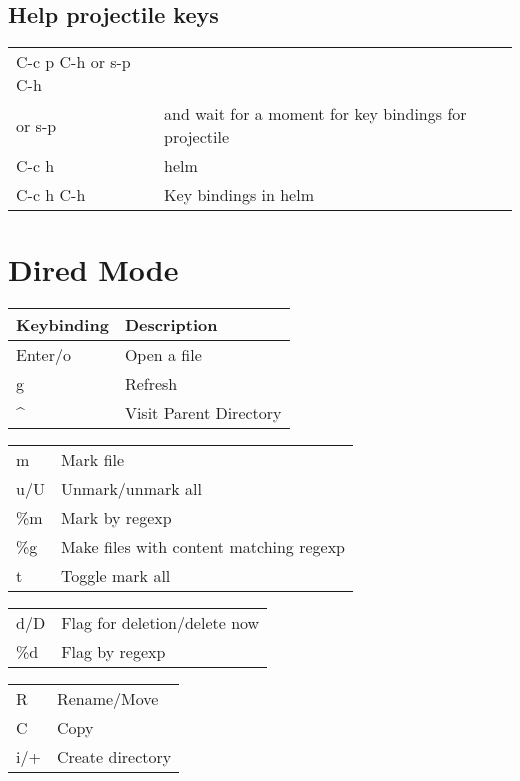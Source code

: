 \documentclass[11pt]{article}
\begin{document}
\subsection{Help projectile keys}
\label{sec:org0626144}
\begin{center}
\begin{tabular}{ll}
\hline
C-c p C-h or s-p C-h & \\
or s-p & and wait for a moment for key bindings for projectile\\
C-c h & helm\\
C-c h C-h & Key bindings in helm\\
\end{tabular}
\end{center}


\section{Dired Mode}
\label{sec:org5251596}
\begin{center}
\begin{tabular}{ll}
Keybinding & Description\\
\hline
Enter/o & Open a file\\
g & Refresh\\
\^{} & Visit Parent Directory\\
\end{tabular}
\end{center}

\begin{center}
\begin{tabular}{ll}
m & Mark file\\
u/U & Unmark/unmark all\\
\%m & Mark by regexp\\
\%g & Make files with content matching regexp\\
t & Toggle mark all\\
\end{tabular}
\end{center}

\begin{center}
\begin{tabular}{ll}
d/D & Flag for deletion/delete now\\
\%d & Flag by regexp\\
\end{tabular}
\end{center}

\begin{center}
\begin{tabular}{ll}
R & Rename/Move\\
C & Copy\\
i/+ & Create directory\\
\end{tabular}
\end{center}
\end{document}
